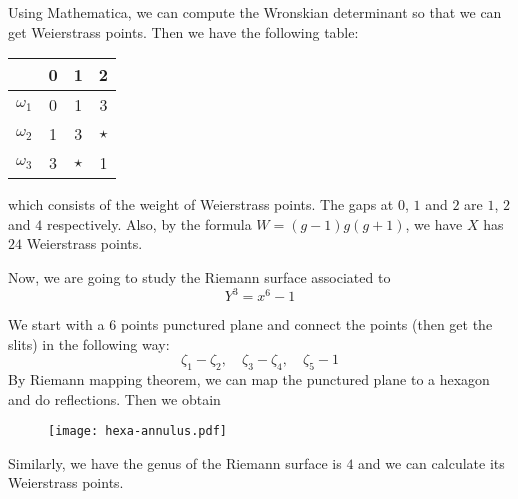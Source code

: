 Using Mathematica, we can compute the Wronskian determinant so that we can get Weierstrass points. Then we have the following table:
\begin{table}[h!]
    \centering
    \begin{tabular}{c|ccc}
        &  0&1&2\\ \hline 
       $\omega_1$  & 0&1 &3  \\
       $\omega_2$  & 1&3 &$\star$\\
       $\omega_3$  & 3&$\star$ &1
    \end{tabular}
\end{table}

which consists of the weight of Weierstrass points. The gaps at $0$, $1$ and $2$ are $1$, $2$ and $4$ respectively. Also, by the formula $W=(g-1)g(g+1)$, we have $X$ has $24$ Weierstrass points. \\ 
\par 
Now, we are going to study the Riemann surface associated to 
\[Y^{3}=x^6-1\]

We start with a $6$ points punctured plane and connect the points (then get the slits) in the following way:
\[\zeta_1 - \zeta_2 ,\quad \zeta_3 - \zeta_4,\quad \zeta_5 - 1 \]
By Riemann mapping theorem, we can map the punctured plane to a hexagon and do reflections. Then we obtain

\begin{figure}[h!]
\centering
\texttt{[image: hexa-annulus.pdf]}
\end{figure}

Similarly, we have the genus of the Riemann surface is $4$ and we can calculate its Weierstrass points.

